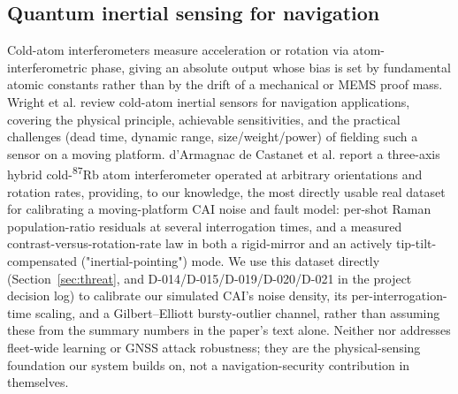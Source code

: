 \documentclass[journal]{IEEEtran}
\begin{document}
\subsection{Quantum inertial sensing for navigation}
Cold-atom interferometers measure acceleration or rotation via atom-interferometric phase, giving an
absolute output whose bias is set by fundamental atomic constants rather than by the drift of a
mechanical or MEMS proof mass. Wright et al. \cite{wright2022cold} review cold-atom inertial sensors for
navigation applications, covering the physical principle, achievable sensitivities, and the practical
challenges (dead time, dynamic range, size/weight/power) of fielding such a sensor on a moving platform.
d'Armagnac de Castanet et al. \cite{darmagnac2024atom} report a three-axis hybrid cold-\textsuperscript{87}Rb
atom interferometer operated at arbitrary orientations and rotation rates, providing, to our knowledge,
the most directly usable real dataset for calibrating a moving-platform CAI noise and fault model: per-shot
Raman population-ratio residuals at several interrogation times, and a measured contrast-versus-rotation-rate
law in both a rigid-mirror and an actively tip-tilt-compensated ("inertial-pointing") mode. We use this
dataset directly (Section~\ref{sec:threat}, and D-014/D-015/D-019/D-020/D-021 in the project decision
log) to calibrate our simulated CAI's noise density, its per-interrogation-time scaling, and a
Gilbert--Elliott bursty-outlier channel, rather than assuming these from the summary numbers in the
paper's text alone. Neither \cite{wright2022cold} nor \cite{darmagnac2024atom} addresses fleet-wide
learning or GNSS attack robustness; they are the physical-sensing foundation our system builds on, not a
navigation-security contribution in themselves.
\end{document}
